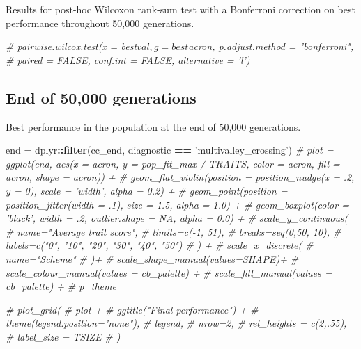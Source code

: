 \documentclass[]{book}
\newenvironment{Shaded}{\begin{snugshade}}{\end{snugshade}}
\newcommand{\CommentTok}[1]{\textcolor[rgb]{0.56,0.35,0.01}{\textit{#1}}}
\newcommand{\KeywordTok}[1]{\textcolor[rgb]{0.13,0.29,0.53}{\textbf{#1}}}
\newcommand{\NormalTok}[1]{#1}
\newcommand{\OperatorTok}[1]{\textcolor[rgb]{0.81,0.36,0.00}{\textbf{#1}}}
\newcommand{\StringTok}[1]{\textcolor[rgb]{0.31,0.60,0.02}{#1}}
\begin{document}
Results for post-hoc Wilcoxon rank-sum test with a Bonferroni correction on best performance throughout 50,000 generations.

\begin{Shaded}
\begin{Highlighting}[]
\CommentTok{# pairwise.wilcox.test(x = best$val, g = best$acron, p.adjust.method = "bonferroni",}
\CommentTok{#                      paired = FALSE, conf.int = FALSE, alternative = 'l')}
\end{Highlighting}
\end{Shaded}

\hypertarget{end-of-50000-generations}{%
\subsection{End of 50,000 generations}\label{end-of-50000-generations}}

Best performance in the population at the end of 50,000 generations.

\begin{Shaded}
\begin{Highlighting}[]
\NormalTok{end =}\StringTok{ }\NormalTok{dplyr}\OperatorTok{::}\KeywordTok{filter}\NormalTok{(cc_end, diagnostic }\OperatorTok{==}\StringTok{ 'multivalley_crossing'}\NormalTok{)}
\CommentTok{# plot = ggplot(end, aes(x = acron, y = pop_fit_max / TRAITS, color = acron, fill = acron, shape = acron)) +}
\CommentTok{#   geom_flat_violin(position = position_nudge(x = .2, y = 0), scale = 'width', alpha = 0.2) +}
\CommentTok{#   geom_point(position = position_jitter(width = .1), size = 1.5, alpha = 1.0) +}
\CommentTok{#   geom_boxplot(color = 'black', width = .2, outlier.shape = NA, alpha = 0.0) +}
\CommentTok{#   scale_y_continuous(}
\CommentTok{#     name="Average trait score",}
\CommentTok{#     limits=c(-1, 51),}
\CommentTok{#     breaks=seq(0,50, 10),}
\CommentTok{#     labels=c("0", "10", "20", "30", "40", "50")}
\CommentTok{#   ) +}
\CommentTok{#   scale_x_discrete(}
\CommentTok{#     name="Scheme"}
\CommentTok{#   )+}
\CommentTok{#   scale_shape_manual(values=SHAPE)+}
\CommentTok{#   scale_colour_manual(values = cb_palette) +}
\CommentTok{#   scale_fill_manual(values = cb_palette) +}
\CommentTok{#   p_theme}

\CommentTok{# plot_grid(}
\CommentTok{#   plot +}
\CommentTok{#     ggtitle("Final performance") +}
\CommentTok{#     theme(legend.position="none"),}
\CommentTok{#   legend,}
\CommentTok{#   nrow=2,}
\CommentTok{#   rel_heights = c(2,.55),}
\CommentTok{#   label_size = TSIZE}
\CommentTok{# )}
\end{Highlighting}
\end{Shaded}
\end{document}
